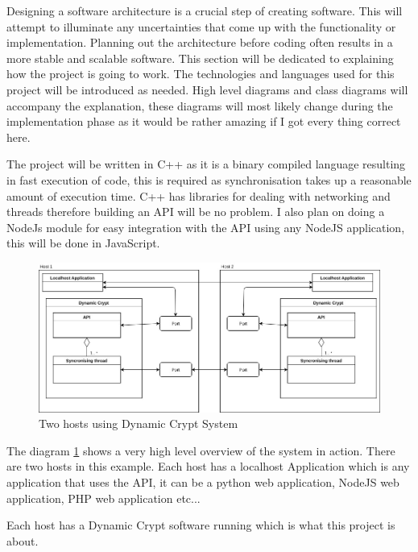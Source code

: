 Designing a software architecture is a crucial step of creating software. This will attempt to illuminate any uncertainties that come up with the functionality or implementation. Planning out the architecture before coding often results in a more stable and scalable software. This section will be dedicated to explaining how the project is going to work. The technologies and languages used for this project will be introduced as needed. High level diagrams and class diagrams will accompany the explanation, these diagrams will most likely change during the implementation phase as it would be rather amazing if I got every thing correct here.

The project will be written in C++ as it is a binary compiled language resulting in fast execution of code, this is required as synchronisation takes up a reasonable amount of execution time. C++ has libraries for dealing with networking and threads therefore building an API will be no problem. I also plan on doing a NodeJs module for easy integration with the API using any NodeJS application, this will be done in JavaScript.

\begin{figure}[!h]
  \centering
      \includegraphics[width=1\textwidth]{Figures/basic-2hosts.jpg}
  \caption[Two hosts using Dynamic Crypt System]{Two hosts using Dynamic Crypt System}
  \label{fig:2hostsbasic}
\end{figure}

\FloatBarrier

The diagram \ref{fig:2hostsbasic} shows a very high level overview of the system in action. There are two hosts in this example. Each host has a localhost Application which is any application that uses the API, it can be a python web application, NodeJS web application, PHP web application etc... 

Each host has a Dynamic Crypt software running which is what this project is about. 


